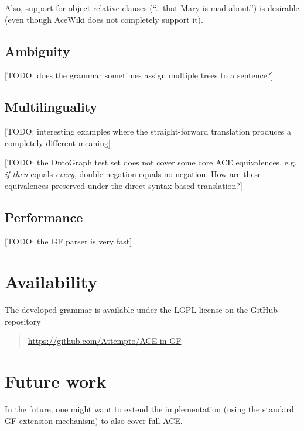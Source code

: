 \documentclass[a4paper]{article}
\begin{document}
Also, support for object relative clauses (``.. that Mary is mad-about'')
is desirable (even though AceWiki does not completely support it).


\subsection{Ambiguity}

[TODO: does the grammar sometimes assign multiple trees to a sentence?]

\subsection{Multilinguality}

[TODO: interesting examples where the straight-forward translation produces
a completely different meaning]

[TODO: the OntoGraph test set does not cover some core ACE equivalences,
e.g. \emph{if-then} equals \emph{every}, double negation equals no negation.
How are these equivalences preserved under the direct syntax-based
translation?]

\subsection{Performance}

[TODO: the GF parser is very fast]

\section{Availability}

The developed grammar is available under the LGPL license on the GitHub
repository

\begin{quote}
\url{https://github.com/Attempto/ACE-in-GF}
\end{quote}

\section{Future work}

In the
future, one might want to extend the implementation (using
the standard GF extension mechanism) to also cover full ACE.



%
\end{document}

